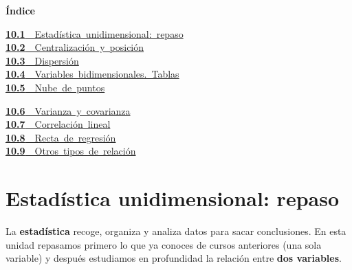 \documentclass[11pt,a4paper]{article}
\begin{document}
\begin{tcolorbox}[colback=fmsurface,colframe=fmsurface,arc=3mm,left=4mm,right=4mm,top=2mm,bottom=2mm]
\small\textbf{Índice}\par\smallskip
\begin{minipage}[t]{0.49\linewidth}\small \mbox{\hyperlink{sec1}{\textbf{\color{fmgreen}10.1}\ \ Estadística unidimensional: repaso}}\\[3pt]
\mbox{\hyperlink{sec2}{\textbf{\color{fmgreen}10.2}\ \ Centralización y posición}}\\[3pt]
\mbox{\hyperlink{sec3}{\textbf{\color{fmgreen}10.3}\ \ Dispersión}}\\[3pt]
\mbox{\hyperlink{sec4}{\textbf{\color{fmgreen}10.4}\ \ Variables bidimensionales. Tablas}}\\[3pt]
\mbox{\hyperlink{sec5}{\textbf{\color{fmgreen}10.5}\ \ Nube de puntos}}\\[3pt]\end{minipage}\hfill\begin{minipage}[t]{0.49\linewidth}\small \mbox{\hyperlink{sec6}{\textbf{\color{fmgreen}10.6}\ \ Varianza y covarianza}}\\[3pt]
\mbox{\hyperlink{sec7}{\textbf{\color{fmgreen}10.7}\ \ Correlación lineal}}\\[3pt]
\mbox{\hyperlink{sec8}{\textbf{\color{fmgreen}10.8}\ \ Recta de regresión}}\\[3pt]
\mbox{\hyperlink{sec9}{\textbf{\color{fmgreen}10.9}\ \ Otros tipos de relación}}\\[3pt]\end{minipage}
\end{tcolorbox}

\section{Estadística unidimensional: repaso}\hypertarget{sec1}{}

La \textbf{estadística} recoge, organiza y analiza datos para sacar conclusiones. En esta unidad repasamos primero lo que ya conoces de cursos anteriores (una sola variable) y después estudiamos en profundidad la relación entre \textbf{dos variables}.
\end{document}
